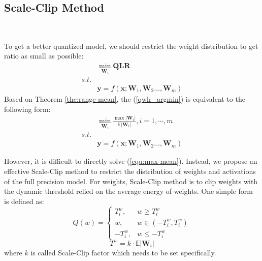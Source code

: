 \documentclass[letterpaper]{article} %
\begin{document}
\subsection{Scale-Clip Method}\

To get a better quantized model, we should restrict the weight distribution to get ratio as small as possible:
\begin{equation}\label{qwlr_argmin}
\begin{aligned}
	& \min_{\mathbf{W}_{i}} \mathbf{QLR}\\
	 s.t. \\
	 & \mathbf{y}=f(\mathbf{x};\mathbf{W}_1,\mathbf{W}_2\dots,\mathbf{W}_m)
\end{aligned}
\end{equation} 
Based on Theorem \ref{the:range-mean}, the (\ref{qwlr_argmin}) is equivalent to the following form:
\begin{equation}\label{equ:max-mean}
\begin{aligned}
& \min_{\mathbf{W}_{i}} \frac{\max|\mathbf{W}_i|}{\mathbb{E}|\mathbf{W}_i|},i=1,\cdots,m \\
s.t. \\
& \mathbf{y}=f(\mathbf{x};\mathbf{W}_1,\mathbf{W}_2\dots,\mathbf{W}_m)
\end{aligned}
\end{equation} 

However, it is difficult to directly solve (\ref{equ:max-mean}).
Instead, we propose an effective Scale-Clip method to restrict the distribution of weights and activations of the full precision model.
For weights, Scale-Clip method is to clip weights with the dynamic threshold relied on the average energy of weights. One simple form is defined as:
\begin{equation}
Q(w)=\left\{
   \begin{array}{lr}
      T^w_i, & w \ge T^w_i \\
      w, & w \in (-T^w_i, T^w_i) \\
      -T^w_i, & w \le -T^w_i 
   \end{array}
\right.
\end{equation}
\begin{equation}\label{threshold}
	T^w=k \cdot \mathbb{E}|\mathbf{W}_{i}|
\end{equation}
where $k$ is called Scale-Clip factor which needs to be set specifically. 

\end{document}
